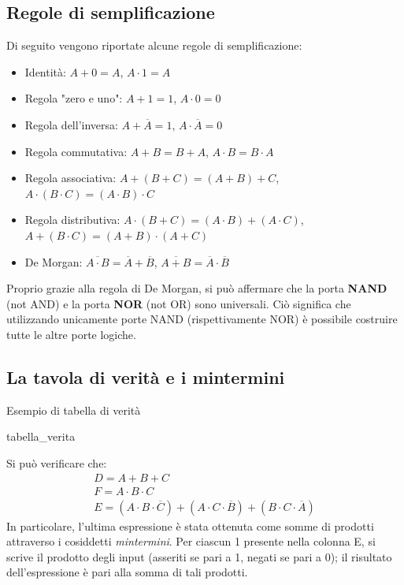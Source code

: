 \documentclass[class=book, crop=false]{standalone}
\begin{document}
\subsection{Regole di semplificazione}
\label{subsec:semplificazione}
Di seguito vengono riportate alcune regole di semplificazione:
\begin{itemize}
	\item Identità: \(A+0=A\), \(A\cdot 1=A\)
	\item Regola "zero e uno": \(A+1=1\), \(A\cdot 0=0\)
	\item Regola dell'inversa: \(A+\overline{A}=1\), \(A\cdot\overline{A}=0\)
	\item Regola commutativa: \(A+B=B+A\), \(A\cdot B=B\cdot A\)
	\item Regola associativa: \(A+(B+C)=(A+B)+C\), \(A\cdot(B\cdot C)=(A\cdot B)\cdot C\)
	\item Regola distributiva: \(A\cdot(B+C)=(A\cdot B)+(A\cdot C)\), \(A+(B\cdot C)=(A+B)\cdot(A+C)\)
	\item De Morgan: \(\overline{A\cdot B} = \overline{A}+\overline{B}\), \(\overline{A+B} = \overline{A}\cdot\overline{B}\)
\end{itemize}
Proprio grazie alla regola di De Morgan, si può affermare che la porta \textbf{NAND} (not AND) e la porta \textbf{NOR} (not OR) sono universali. Ciò significa che utilizzando unicamente porte NAND (rispettivamente NOR) è possibile costruire tutte le altre porte logiche.
\subsection{La tavola di verità e i mintermini}
\label{subsec:mintermini}
\begin{table}[!h]
	\centering
	\caption{Esempio di tabella di verità}
	{tabella_verita}
	\label{tabella-verita}
\end{table}
Si può verificare che:
\begin{gather*}
D = A+B+C\\
F = A\cdot B\cdot C\\
E = (A\cdot B\cdot\overline{C}) + (A\cdot C\cdot\overline{B}) + (B\cdot C\cdot\overline{A})
\end{gather*}
In particolare, l'ultima espressione è stata ottenuta come somme di prodotti attraverso i cosiddetti \emph{mintermini}. Per ciascun 1 presente nella colonna E, si scrive il prodotto degli input (asseriti se pari a 1, negati se pari a 0); il risultato dell'espressione è pari alla somma di tali prodotti.
\end{document}
